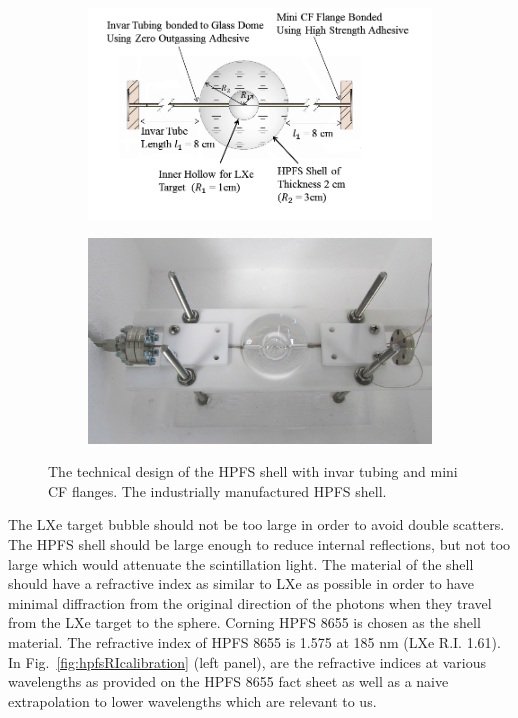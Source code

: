 \begin{figure}[h]
\centering
\begin{subfigure}[c]{0.4\textheight}
\includegraphics[width=\textwidth]{spheredesign1.png}
\end{subfigure}
\begin{subfigure}[c]{0.25\textheight}
\includegraphics[width=\textwidth]{spherephoto.png}
\end{subfigure}
\caption{ The technical design of the HPFS shell with invar tubing and mini CF flanges. 
 The industrially manufactured HPFS shell.} 
\label{fig:sphere}
\end{figure}



The LXe target bubble should not be too large in order to avoid double scatters. 
The HPFS shell should be large enough to reduce internal reflections, but not 
too large which would attenuate the scintillation light. The material of the 
shell should have a refractive index as similar to LXe as possible in order to 
have minimal diffraction from the original direction of the photons when they 
travel from the LXe target to the sphere. Corning HPFS 8655 is chosen as the shell 
material. The refractive index of HPFS 8655 is 1.575 at 185 nm (LXe R.I. 1.61). 
In Fig.~\ref{fig:hpfsRIcalibration} (left panel), are the refractive indices at various wavelengths 
as provided on the HPFS 8655 fact sheet as well as a naive extrapolation to lower wavelengths 
which are relevant to us. 

